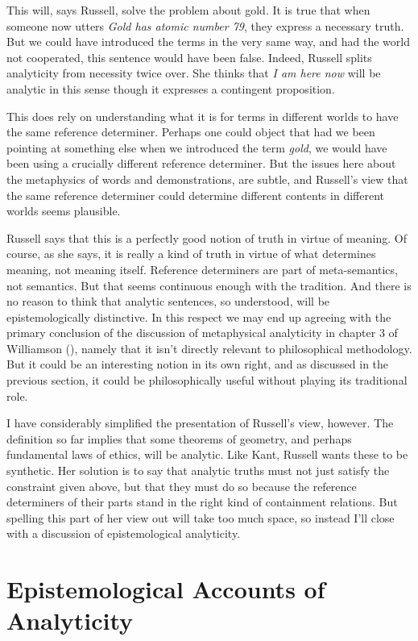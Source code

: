 \documentclass[
  11pt,
  letterpaper,
  DIV=11,
  numbers=noendperiod,
  twoside]{scrartcl}
\begin{document}
This will, says Russell, solve the problem about gold. It is true that
when someone now utters \emph{Gold has atomic number 79}, they express a
necessary truth. But we could have introduced the terms in the very same
way, and had the world not cooperated, this sentence would have been
false. Indeed, Russell splits analyticity from necessity twice over. She
thinks that \emph{I am here now} will be analytic in this sense though
it expresses a contingent proposition.

This does rely on understanding what it is for terms in different worlds
to have the same reference determiner. Perhaps one could object that had
we been pointing at something else when we introduced the term
\emph{gold}, we would have been using a crucially different reference
determiner. But the issues here about the metaphysics of words and
demonstrations, are subtle, and Russell's view that the same reference
determiner could determine different contents in different worlds seems
plausible.

Russell says that this is a perfectly good notion of truth in virtue of
meaning. Of course, as she says, it is really a kind of truth in virtue
of what determines meaning, not meaning itself. Reference determiners
are part of meta-semantics, not semantics. But that seems continuous
enough with the tradition. And there is no reason to think that analytic
sentences, so understood, will be epistemologically distinctive. In this
respect we may end up agreeing with the primary conclusion of the
discussion of metaphysical analyticity in chapter 3 of Williamson
(), namely that it isn't
directly relevant to philosophical methodology. But it could be an
interesting notion in its own right, and as discussed in the previous
section, it could be philosophically useful without playing its
traditional role.

I have considerably simplified the presentation of Russell's view,
however. The definition so far implies that some theorems of geometry,
and perhaps fundamental laws of ethics, will be analytic. Like Kant,
Russell wants these to be synthetic. Her solution is to say that
analytic truths must not just satisfy the constraint given above, but
that they must do so because the reference determiners of their parts
stand in the right kind of containment relations. But spelling this part
of her view out will take too much space, so instead I'll close with a
discussion of epistemological analyticity.

\section{Epistemological Accounts of
Analyticity}\label{epistemologicalaccountsofanalyticity}
\end{document}
